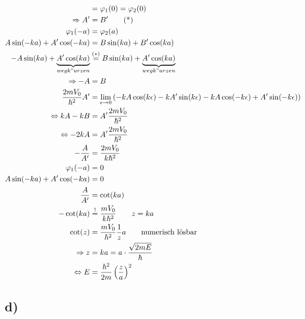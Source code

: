 \begin{align*}
        &= \varphi_1(0) = \varphi_2(0)\\
        \Rightarrow A' &= B' \tag{*}\\
        \varphi_1(-a) &= \varphi_2(a)\\
        A\sin(-ka) + A'\cos(-ka) &= B\sin(ka) + B'\cos(ka) \\
        -A\sin(ka) + \underbrace{A'\cos(ka)}_{wegk"urzen} &\stackrel{(*)}{=} B\sin(ka) + \underbrace{A'\cos(ka)}_{wegk"urzen}\\
        \Rightarrow -A &= B\\
        \frac{2mV_0}{\hbar^2}A' &= \lim_{\epsilon \to 0} \left( -kA\cos(k\epsilon) - kA'\sin(k\epsilon) - kA\cos(-k\epsilon) + A'\sin(-k\epsilon) \right) \\
        \Leftrightarrow kA - kB &= A'\frac{2mV_0}{\hbar^2}\\
        \Leftrightarrow -2kA &= A'\frac{2mV_0}{\hbar^2}\\
        -\frac{A}{A'} &= \frac{2mV_0}{k\hbar^2}\\
        \varphi_1(-a) &= 0\\
        A\sin(-ka) + A'\cos(-ka) &= 0\\
        \frac{A}{A'} &= \cot(ka)\\
        -\cot(ka) &\stackrel{!}{=} \frac{mV_0}{k\hbar^2} \qquad z=ka\\
        \cot(z) &= \frac{mV_0}{\hbar^2} \frac{1}{z}a \qquad \text{numerisch lösbar}\\
        \Rightarrow z &= ka = a \cdot \frac{\sqrt{2mE}}{\hbar}\\
        \Leftrightarrow E &= \frac{\hbar^2}{2m} \left( \frac{z}{a} \right)^2
    \end{align*}

    \subsection{d)}

